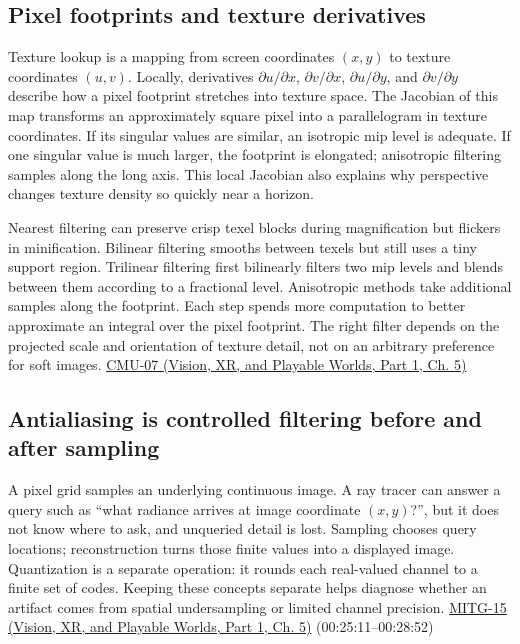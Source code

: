 \subsection{Pixel footprints and texture derivatives}\label{03-visual-computing-i-ch004-pixel-footprints-and-texture-derivatives}

\hypertarget{03-visual-computing-i-ch004-pixel-footprints-and-texture-derivatives}{}

Texture lookup is a mapping from screen coordinates \((x,y)\) to texture coordinates \((u,v)\). Locally, derivatives \(\partial u/\partial x\), \(\partial v/\partial x\), \(\partial u/\partial y\), and \(\partial v/\partial y\) describe how a pixel footprint stretches into texture space. The Jacobian of this map transforms an approximately square pixel into a parallelogram in texture coordinates. If its singular values are similar, an isotropic mip level is adequate. If one singular value is much larger, the footprint is elongated; anisotropic filtering samples along the long axis. This local Jacobian also explains why perspective changes texture density so quickly near a horizon.

Nearest filtering can preserve crisp texel blocks during magnification but flickers in minification. Bilinear filtering smooths between texels but still uses a tiny support region. Trilinear filtering first bilinearly filters two mip levels and blends between them according to a fractional level. Anisotropic methods take additional samples along the footprint. Each step spends more computation to better approximate an integral over the pixel footprint. The right filter depends on the projected scale and orientation of texture detail, not on an arbitrary preference for soft images. \href{../07-Vision-XR-and-Playable-Worlds-P01/main.pdf\#nameddest=04-visual-computing-ii-ch036-cmu-07---perspective-projection-and-texture-mapping}{CMU-07 (Vision, XR, and Playable Worlds, Part 1, Ch. 5)}

\subsection{Antialiasing is controlled filtering before and after sampling}\label{03-visual-computing-i-ch004-antialiasing-is-controlled-filtering-before-and-after-sampling}

\hypertarget{03-visual-computing-i-ch004-antialiasing-is-controlled-filtering-before-and-after-sampling}{}

A pixel grid samples an underlying continuous image. A ray tracer can answer a query such as ``what radiance arrives at image coordinate \((x,y)\)?'', but it does not know where to ask, and unqueried detail is lost. Sampling chooses query locations; reconstruction turns those finite values into a displayed image. Quantization is a separate operation: it rounds each real-valued channel to a finite set of codes. Keeping these concepts separate helps diagnose whether an artifact comes from spatial undersampling or limited channel precision. \href{../07-Vision-XR-and-Playable-Worlds-P01/main.pdf\#nameddest=04-visual-computing-ii-ch036-mitg-15---antialiasing}{MITG-15 (Vision, XR, and Playable Worlds, Part 1, Ch. 5)} (00:25:11--00:28:52)

